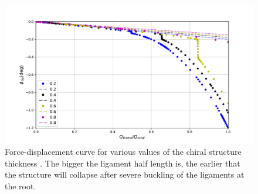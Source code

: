       \begin{figure}[!htpb] %
        \centering
        \includegraphics[width=0. \textwidth]{../figures/result-sim/chiral_t/force_displacement-far}
        \caption[Force-displacement curve for various values of the chiral structure thickness]{Force-displacement curve for various values of the chiral structure thickness \chit. The bigger the ligament half length is, the earlier that the structure will collapse after severe buckling of the ligaments at the root.}\label{fig:forceDisplacement-far-chiral-t}
      \end{figure}